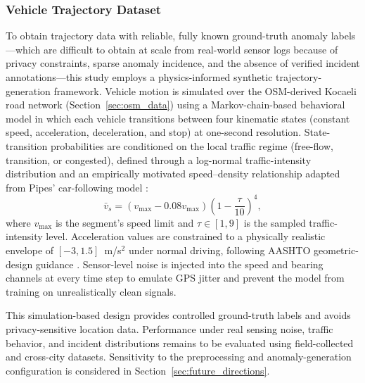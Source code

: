 \documentclass[journal]{IEEEtran}
\begin{document}
\subsubsection{Vehicle Trajectory Dataset}
\nocite{wen_hdsvt_2025,feng_traffic_2024_dup2,yu_spatio-temporal_2018,li_diffusion_2018,wu_graph_2019,francies_framework_2025,pipes_car_following_1967,aashto_green_book_2018}
To obtain trajectory data with reliable, fully known ground-truth anomaly labels---which are difficult to obtain at scale from real-world sensor logs because of privacy constraints, sparse anomaly incidence, and the absence of verified incident annotations---this study employs a physics-informed synthetic trajectory-generation framework. Vehicle motion is simulated over the OSM-derived Kocaeli road network (Section~\ref{sec:osm_data}) using a Markov-chain-based behavioral model in which each vehicle transitions between four kinematic states (constant speed, acceleration, deceleration, and stop) at one-second resolution. State-transition probabilities are conditioned on the local traffic regime (free-flow, transition, or congested), defined through a log-normal traffic-intensity distribution and an empirically motivated speed--density relationship adapted from Pipes' car-following model \cite{pipes_car_following_1967}:
\begin{equation}
  \bar{v}_s = (v_{\max} - 0.08v_{\max})\left(1-\frac{\tau}{10}\right)^4,
\end{equation}
where $v_{\max}$ is the segment's speed limit and $\tau \in [1,9]$ is the sampled traffic-intensity level. Acceleration values are constrained to a physically realistic envelope of $[-3,1.5]$~m/s$^2$ under normal driving, following AASHTO geometric-design guidance \cite{aashto_green_book_2018}. Sensor-level noise is injected into the speed and bearing channels at every time step to emulate GPS jitter and prevent the model from training on unrealistically clean signals.

This simulation-based design provides controlled ground-truth labels and avoids privacy-sensitive location data. Performance under real sensing noise, traffic behavior, and incident distributions remains to be evaluated using field-collected and cross-city datasets. Sensitivity to the preprocessing and anomaly-generation configuration is considered in Section~\ref{sec:future_directions}.
\end{document}
